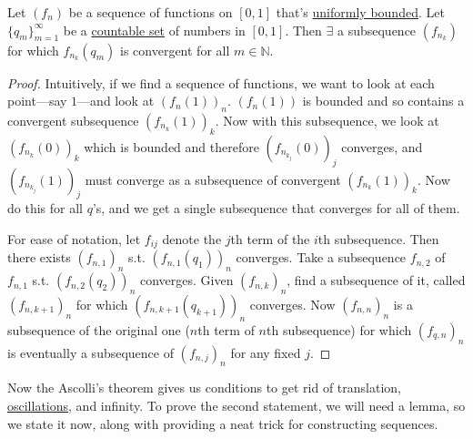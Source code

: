   \begin{lemma}
    \label{thm:sequence-functions-uniformly-bounded-countable}
 
    Let $(f_n)$ be a sequence of functions on $[0, 1]$ that's \hyperref[def:uniformly-bounded]{uniformly bounded}. Let $\{q_m\}_{m=1}^\infty$ be a \hyperref[st-def:countable]{countable set} of numbers in $[0, 1]$. Then $\exists$ a subsequence $(f_{n_k})$ for which $f_{n_k} (q_m)$ is convergent for all $m \in \mathbb{N}$. 
  \end{lemma}
  \begin{proof}
    Intuitively, if we find a sequence of functions, we want to look at each point---say $1$---and look at $(f_n (1))_n$. $(f_n (1))$ is bounded and so contains a convergent subsequence $(f_{n_k} (1))_k$. Now with this subsequence, we look at $(f_{n_k} (0))_k$ which is bounded and therefore $(f_{n_{k_j}}(0))_j$ converges, and $(f_{n_{k_{j}}}(1))_j$ must converge as a subsequence of convergent $(f_{n_k} (1))_k$. Now do this for all $q$'s, and we get a single subsequence that converges for all of them. 

    For ease of notation, let $f_{ij}$ denote the $j$th term of the $i$th subsequence. Then there exists $(f_{n, 1})_n$ s.t. $(f_{n, 1} (q_1))_n$ converges. Take a subsequence $f_{n, 2}$ of $f_{n, 1}$ s.t. $(f_{n, 2} (q_2))_n$ converges. Given $(f_{n, k})_n$, find a subsequence of it, called $(f_{n, k+1})_n$ for which $(f_{n, k+1} (q_{k+1}))_n$ converges. Now $(f_{n, n})_n$ is a subsequence of the original one ($n$th term of $n$th subsequence) for which $(f_{q, n})_n$ is eventually a subsequence of $(f_{n, j})_n$ for any fixed $j$. 
  \end{proof} 

  Now the Ascolli's theorem gives us conditions to get rid of translation, \hyperref[def:oscillation]{oscillations}, and infinity. To prove the second statement, we will need a lemma, so we state it now, along with providing a neat trick for constructing sequences. 

